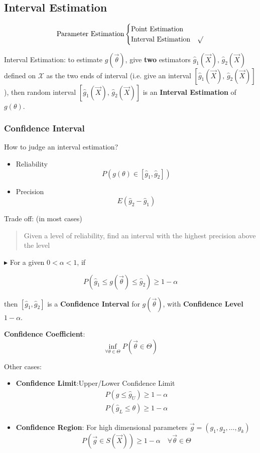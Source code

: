 \documentclass[11pt,a4paper]{ctexart}
\numberwithin{equation}{section}%
\newenvironment{point}{\raggedright$\blacktriangleright$}{}%
\begin{document}
\subsection{Interval Estimation}\label{SectionIntervalEstimation}
\[
    \text{Parameter Estimation}\begin{cases}
        \text{Point Estimation}& \\
        \text{Interval Estimation}& \surd
    \end{cases}    
\]

    Interval Estimation: to estimate $g(\vec{\theta})$, give \textbf{two} estimators $\hat{g}_1(\vec{X}),\, \hat{g}_2(\vec{X})$ defined on $\mathscr{X}$ as the two ends of interval (i.e. give an interval $[\hat{g}_1(\vec{X}),\, \hat{g}_2(\vec{X})]$), then random interval $[\hat{g}_1(\vec{X}),\, \hat{g}_2(\vec{X})]$ is an \textbf{Interval Estimation} of $g(\theta)$.

    \subsubsection{Confidence Interval}\label{SubSectionConfidenceInterval}
    How to judge an interval estimation?
    \begin{itemize}
        \item Reliability
        \[P(g(\theta)\in[\hat{g}_1,\hat{g}_2])\]
        \item Precision
        \[E(\hat{g}_2-\hat{g}_1)\]
    \end{itemize}

    Trade off: (in most cases)
    \begin{quote}
        Given a level of reliability, find an interval with the highest precision above the level
    \end{quote}

\begin{point}
    For a given $0<\alpha<1$, if 
\end{point}

    \[
        P(\hat{g}_1\leq g(\vec{\theta})\leq \hat{g}_2)\geq 1-\alpha
    \]

    then $[\hat{g}_1,\hat{g}_2]$ is a \textbf{Confidence Interval} for $g(\vec{\theta})$, with \textbf{Confidence Level} $1-\alpha$. 
    
    \textbf{Confidence Coefficient}:
    \[\inf_{\forall\theta\in\Theta}P(
        \vec{\theta}\in\Theta
    )\]

    Other cases:
    \begin{itemize}[topsep=-4pt]
        \item \textbf{Confidence Limit}:Upper/Lower Confidence Limit
    \begin{align*}
        P(g\leq \hat{g}_U)\geq 1-\alpha\\
        P(\hat{g}_L\leq \theta)\geq 1-\alpha
    \end{align*}
        \item \textbf{Confidence Region}: For high dimensional parameters $\vec{g}=(g_1,g_2,\ldots,g_k)$
        \[P(\vec{g}\in S(\vec{X}))\geq 1-\alpha\quad \forall \vec{\theta}\in\Theta \]
        
    \end{itemize}
\end{document}
